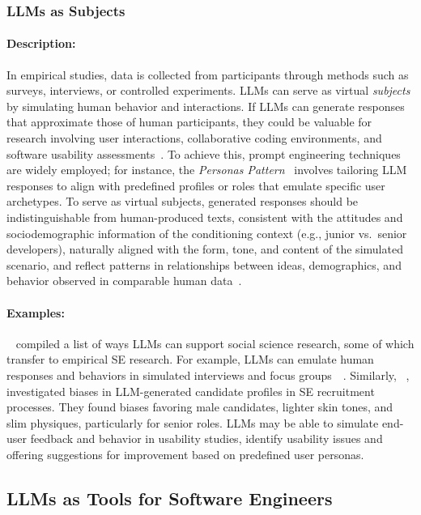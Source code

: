 \documentclass[smallextended]{svjour3}
\newcommand{\studytypesubsection}[1]{\subsubsection{#1}}
\newcommand{\studytypeparagraph}[1]{\paragraph{\bfseries #1:}}
\newcommand{\studytypesubsection}[1]{\subsection{#1}}
\newcommand{\studytypeparagraph}[1]{\subsubsection{#1}}
\begin{document}
\studytypesubsection{LLMs as Subjects}
\label{sec:llms-as-subjects}

\studytypeparagraph{Description}

In empirical studies, data is collected from participants through methods such as surveys, interviews, or controlled experiments.
LLMs can serve as virtual \emph{subjects} by simulating human behavior and interactions. If LLMs can generate responses that approximate those of human participants, they could be valuable for research involving user interactions, collaborative coding environments, and software usability assessments~\cite{ZHAO2025101167}.
To achieve this, prompt engineering techniques are widely employed; for instance, the \textit{Personas Pattern}~\cite{DBLP:conf/naacl/KongZCLQSZWD24} involves tailoring LLM responses to align with predefined profiles or roles that emulate specific user archetypes.
To serve as virtual subjects, generated responses should be indistinguishable from human-produced texts, consistent with the attitudes and sociodemographic information of the conditioning context (e.g., junior vs.\ senior developers), naturally aligned with the form, tone, and content of the simulated scenario, and reflect patterns in relationships between ideas, demographics, and behavior observed in comparable human data~\cite{DBLP:journals/corr/abs-2209-06899}.

\studytypeparagraph{Examples}

\citeauthor{DBLP:journals/ipm/XuSRGPLSH24}~\cite{DBLP:journals/ipm/XuSRGPLSH24} compiled a list of ways LLMs can support social science research, some of which transfer to empirical SE research. For example, LLMs can emulate human responses and behaviors in simulated interviews and focus groups~\citeauthor{DBLP:journals/ase/GerosaTSS24}~\cite{DBLP:journals/ase/GerosaTSS24}. Similarly, \citeauthor{DBLP:conf/icse/BanoGH25}~\cite{DBLP:conf/icse/BanoGH25}, investigated biases in LLM-generated candidate profiles in SE recruitment processes. They found biases favoring male candidates, lighter skin tones, and slim physiques, particularly for senior roles. LLMs may be able to simulate end-user feedback and behavior in usability studies, identify usability issues and offering suggestions for improvement based on predefined user personas.
 
\subsection{LLMs as Tools for Software Engineers}
\label{sec:llms-as-tools-for-software-engineers}
\end{document}
